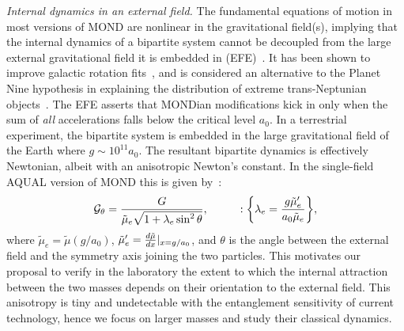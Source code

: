 \documentclass[aps,prl,reprint,superscriptaddress,nofootinbib,floatfix]{revtex4-2}
\begin{document}
\emph{Internal dynamics in an external field.}
The fundamental equations of motion in most versions of MOND are nonlinear in the gravitational field(s), implying that the internal dynamics of a bipartite system cannot be decoupled from the large external gravitational field it is embedded in (EFE)~\cite{MOND-Milogram1983,Lag4MOND-Bekenstein1984,EquiPri-Norton1985}.
It has been shown to improve galactic rotation fits~\cite{MOND-Hees2015}, and is considered an alternative to the Planet Nine hypothesis in explaining the distribution of extreme trans-Neptunian objects~\cite{MOND-P9-Migaszewski2023,MOND-P9-Mathur2023}.
The EFE asserts that MONDian modifications kick in only when the sum of \emph{all} accelerations falls below the critical level $a_0$.
In a terrestrial experiment, the bipartite system is embedded in the large gravitational field of the Earth where $g \sim 10^{11}a_0$.
The resultant bipartite dynamics is effectively Newtonian, albeit with an anisotropic Newton's constant.
In the single-field AQUAL version of MOND this is given by~\cite{EFE-Blanchet2011}:
\begin{equation}
\mathcal{G}_\theta = \frac{G}{\tilde \mu_e\sqrt{1+ 
\lambda_e \sin^2\theta}} , \hspace{1cm} : \qty{ \lambda_e =  \frac{g \tilde \mu_e'}{a_0 \tilde \mu_e} },
\label{eq:Anisotropic-G}
\end{equation}
where $\tilde \mu_e = \tilde \mu(g/a_0)$, 
$\tilde \mu_e' = \dv{\tilde \mu}{x}|_{x=g/a_0}$, and $\theta$ is the angle between the external field and the symmetry axis joining the two particles.
This motivates our proposal to verify in the laboratory the extent to which the internal attraction between the two masses depends on their orientation to the external field.
This anisotropy is tiny and undetectable with the entanglement sensitivity of current technology, hence we focus on larger masses and study their classical dynamics.


\end{document}
